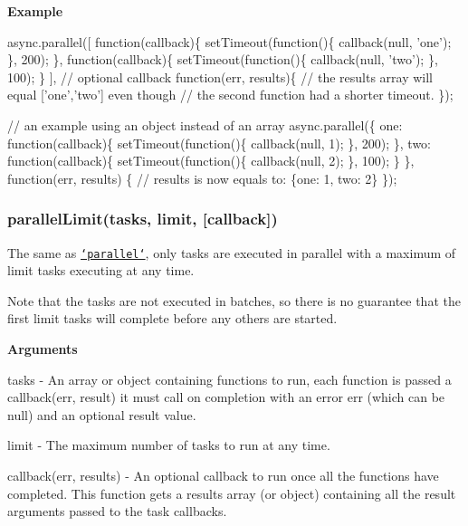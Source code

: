 {\bfseries Example}


\begin{DoxyCode}
async.parallel([
    \textcolor{keyword}{function}(callback)\{
        setTimeout(\textcolor{keyword}{function}()\{
            callback(null, \textcolor{stringliteral}{'one'});
        \}, 200);
    \},
    \textcolor{keyword}{function}(callback)\{
        setTimeout(\textcolor{keyword}{function}()\{
            callback(null, \textcolor{stringliteral}{'two'});
        \}, 100);
    \}
],
\textcolor{comment}{// optional callback}
\textcolor{keyword}{function}(err, results)\{
    \textcolor{comment}{// the results array will equal ['one','two'] even though}
    \textcolor{comment}{// the second function had a shorter timeout.}
\});


\textcolor{comment}{// an example using an object instead of an array}
async.parallel(\{
    one: \textcolor{keyword}{function}(callback)\{
        setTimeout(\textcolor{keyword}{function}()\{
            callback(null, 1);
        \}, 200);
    \},
    two: \textcolor{keyword}{function}(callback)\{
        setTimeout(\textcolor{keyword}{function}()\{
            callback(null, 2);
        \}, 100);
    \}
\},
\textcolor{keyword}{function}(err, results) \{
    \textcolor{comment}{// results is now equals to: \{one: 1, two: 2\}}
\});
\end{DoxyCode}
 



\label{_parallelLimit}%
 \subsubsection*{parallel\+Limit(tasks, limit, \mbox{[}callback\mbox{]})}

The same as \href{#parallel}{\tt `parallel`}, only {\ttfamily tasks} are executed in parallel with a maximum of {\ttfamily limit} tasks executing at any time.

Note that the {\ttfamily tasks} are not executed in batches, so there is no guarantee that the first {\ttfamily limit} tasks will complete before any others are started.

{\bfseries Arguments}


\begin{DoxyItemize}
\item {\ttfamily tasks} -\/ An array or object containing functions to run, each function is passed a {\ttfamily callback(err, result)} it must call on completion with an error {\ttfamily err} (which can be {\ttfamily null}) and an optional {\ttfamily result} value.
\item {\ttfamily limit} -\/ The maximum number of {\ttfamily tasks} to run at any time.
\item {\ttfamily callback(err, results)} -\/ An optional callback to run once all the functions have completed. This function gets a results array (or object) containing all the result arguments passed to the {\ttfamily task} callbacks. 


\end{DoxyItemize}

